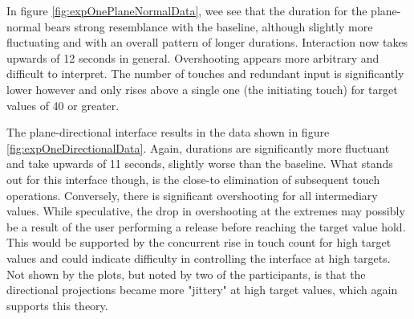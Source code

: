 
In figure \ref{fig:expOnePlaneNormalData}, wee see that the duration for the plane-normal bears strong resemblance with the baseline, although slightly more fluctuating and with an overall pattern of longer durations. Interaction now takes upwards of 12 seconds in general. Overshooting appears more arbitrary and difficult to interpret. The number of touches and redundant input  is significantly lower however and only rises above a single one (the initiating touch) for target values of 40 or greater. 

\begin{figure*}[!ht]
	\centering
	\vspace*{-2cm}
	\caption{The data collected for the plane-normal interface. Inertia data do not exist here, as it is not a feature of any of the off-screen interfaces.}
	\label{fig:expOnePlaneNormalData}
\end{figure*}



%

The plane-directional interface results in the data shown in figure \ref{fig:expOneDirectionalData}. Again, durations are significantly more fluctuant and take upwards of 11 seconds, slightly worse than the baseline. What stands out for this interface though, is the close-to elimination of subsequent touch operations. Conversely, there is significant overshooting for all intermediary values. While speculative, the drop in overshooting at the extremes may possibly be a result of the user performing a release before reaching the target value hold. This would be supported by the concurrent rise in touch count for high target values and could indicate difficulty in controlling the interface at high targets. Not shown by the plots, but noted by two of the participants, is that the directional projections became more "jittery" at high target values, which again supports this theory.



\begin{figure*}[!ht]
	\centering
	\vspace*{-2cm}
	\caption{The data for the plane-directional interface.}
	\label{fig:expOneDirectionalData}
\end{figure*}

